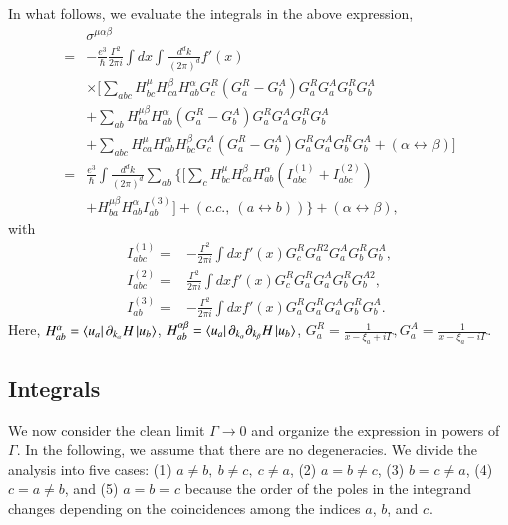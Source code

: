 \documentclass[twocolumn,superscriptaddress]{revtex4-1}
\begin{document}
In what follows, we evaluate the integrals in the above expression,
\begin{align}
  &\sigma^{\mu\alpha\beta}\nonumber \\
  =&-\frac{e^3}{\hbar}\frac{\Gamma^2 }{2\pi i} \int dx \int \frac{d^d k}{(2\pi)^d}f'(x)\nonumber \\
  &\times \Big[\sum_{abc}H_{bc}^\mu H_{ca}^\beta H_{ab}^\alpha G^R_c \left(G^R_a-G^A_b\right)G^R_a G^A_a G^R_b G^A_b  \nonumber \\
  &+\sum_{ab}H_{ba}^{\mu\beta} H_{ab}^\alpha\left(G^R_a-G^A_b\right)G^R_a G^A_a G^R_b G^A_b \nonumber \\
  &+\sum_{abc}H_{ca}^\mu H_{ab}^\alpha H_{bc}^\beta G^A_c \left(G^R_a-G^A_b\right)G^R_a G^A_a G^R_b G^A_b +(\alpha \leftrightarrow \beta)\Big] \nonumber \\
  =&\frac{e^3}{\hbar}\int \frac{d^d k}{(2\pi)^d}\sum_{ab}\Bigg\{ \Big[\sum_{c}H_{bc}^\mu H_{ca}^\beta H_{ab}^\alpha (I_{abc}^{(1)}+I_{abc}^{(2)})  \nonumber \\
  &+H_{ba}^{\mu\beta} H_{ab}^\alpha I_{ab}^{(3)}\Big]+(c.c.,\ (a\leftrightarrow b))\Bigg\}+(\alpha \leftrightarrow \beta), \label{eq:generalNonReciprocalKernel}
\end{align}
with
\begin{align}
  I_{abc}^{(1)}=&-\frac{\Gamma^2 }{2\pi i} \int dx f'(x) G^R_c G^{R2}_a G^A_a G^R_b G^A_b, \\
  I_{abc}^{(2)}=&\frac{\Gamma^2 }{2\pi i} \int dx f'(x) G^R_c G^R_a G^A_a G^R_b G^{A2}_b, \\
  I_{ab}^{(3)}=&-\frac{\Gamma^2 }{2\pi i} \int dx f'(x) G^R_aG^R_a G^A_a G^R_b G^A_b.
\end{align}
Here, $H_{ab}^\alpha=\bra{u_a}\partial_{k_\alpha} H\ket{u_b}$, $H_{ab}^{\alpha\beta}=\bra{u_a}\partial_{k_\alpha} \partial_{k_\beta} H\ket{u_b}$, $G^R_a=\frac{1}{x-\xi_a+i\Gamma},G^A_a=\frac{1}{x-\xi_a-i\Gamma}$.

\subsection{Integrals}
We now consider the clean limit $\Gamma \to 0$ and organize the expression in powers of $\Gamma$.
In the following, we assume that there are no degeneracies.
We divide the analysis into five cases: (1) $a\neq b,\ b\neq c,\ c\neq a$, (2) $a=b\neq c$, (3) $b=c\neq a$, (4) $c=a\neq b$, and (5) $a=b=c$ because the order of the poles in the integrand changes depending on the coincidences among the indices $a$, $b$, and $c$.
\end{document}
